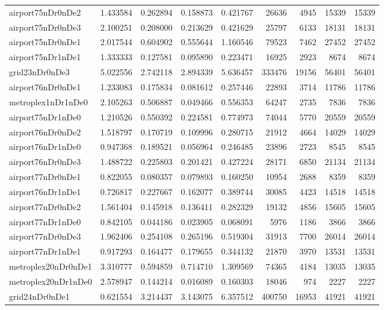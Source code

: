 \begin{longtable}{|l|r|r|r|r|r|r|r|r|}
airport75nDr0nDe2 & 1.433584 & 0.262894 & 0.158873 & 0.421767 & 26636 & 4945 & 15339 & 15339 \\
airport75nDr0nDe3 & 2.100251 & 0.208000 & 0.213629 & 0.421629 & 25797 & 6133 & 18131 & 18131 \\
airport75nDr0nDe1 & 2.017544 & 0.604902 & 0.555644 & 1.160546 & 79523 & 7462 & 27452 & 27452 \\
airport75nDr1nDe1 & 1.333333 & 0.127581 & 0.095890 & 0.223471 & 16925 & 2923 & 8674 & 8674 \\
grid23nDr0nDe3 & 5.022556 & 2.742118 & 2.894339 & 5.636457 & 333476 & 19156 & 56401 & 56401 \\
airport76nDr0nDe1 & 1.233083 & 0.175834 & 0.081612 & 0.257446 & 22893 & 3714 & 11786 & 11786 \\
metroplex1nDr1nDe0 & 2.105263 & 0.506887 & 0.049466 & 0.556353 & 64247 & 2735 & 7836 & 7836 \\
airport75nDr1nDe0 & 1.210526 & 0.550392 & 0.224581 & 0.774973 & 74044 & 5770 & 20559 & 20559 \\
airport76nDr0nDe2 & 1.518797 & 0.170719 & 0.109996 & 0.280715 & 21912 & 4664 & 14029 & 14029 \\
airport76nDr1nDe0 & 0.947368 & 0.189521 & 0.056964 & 0.246485 & 23896 & 2723 & 8545 & 8545 \\
airport76nDr0nDe3 & 1.488722 & 0.225803 & 0.201421 & 0.427224 & 28171 & 6850 & 21134 & 21134 \\
airport77nDr0nDe1 & 0.822055 & 0.080357 & 0.079893 & 0.160250 & 10954 & 2688 & 8359 & 8359 \\
airport76nDr1nDe1 & 0.726817 & 0.227667 & 0.162077 & 0.389744 & 30085 & 4423 & 14518 & 14518 \\
airport77nDr0nDe2 & 1.561404 & 0.145918 & 0.136411 & 0.282329 & 19132 & 4856 & 15605 & 15605 \\
airport77nDr1nDe0 & 0.842105 & 0.044186 & 0.023905 & 0.068091 & 5976 & 1186 & 3866 & 3866 \\
airport77nDr0nDe3 & 1.962406 & 0.254108 & 0.265196 & 0.519304 & 31913 & 7700 & 26014 & 26014 \\
airport77nDr1nDe1 & 0.917293 & 0.164477 & 0.179655 & 0.344132 & 21870 & 3970 & 13531 & 13531 \\
metroplex20nDr0nDe1 & 3.310777 & 0.594859 & 0.714710 & 1.309569 & 74365 & 4184 & 13035 & 13035 \\
metroplex20nDr1nDe0 & 2.578947 & 0.144214 & 0.016089 & 0.160303 & 18046 & 974 & 2227 & 2227 \\
grid24nDr0nDe1 & 0.621554 & 3.214437 & 3.143075 & 6.357512 & 400750 & 16953 & 41921 & 41921 \\

\end{longtable}

